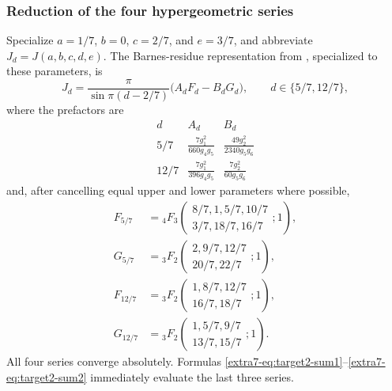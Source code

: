 \documentclass[11pt,a4paper]{article}
\theoremstyle{definition}
\theoremstyle{remark}
\numberwithin{equation}{section}
\begin{document}
\subsubsection{Reduction of the four hypergeometric series}

Specialize $a=1/7$, $b=0$, $c=2/7$, and $e=3/7$, and abbreviate
$J_d=J(a,b,c,d,e)$.  The Barnes-residue representation from
\cite{extra8-zudilin}, specialized to these parameters, is
\begin{equation}\label{extra7-eq:target2-barnes}
 J_d=\frac{\pi}{\sin\pi(d-2/7)}
       \bigl(A_dF_d-B_dG_d\bigr),
 \qquad d\in\{5/7,12/7\},
\end{equation}
where the prefactors are
\[
\begin{array}{c|cc}
 d&A_d&B_d\\ \hline
 5/7&\displaystyle\frac{7g_1^2}{660g_4g_5}
     &\displaystyle\frac{49g_2^2}{2340g_5g_6}\\[2mm]
 12/7&\displaystyle\frac{7g_1^2}{396g_4g_5}
      &\displaystyle\frac{7g_2^2}{60g_5g_6}
\end{array}
\]
and, after cancelling equal upper and lower parameters where possible,
\begin{align*}
 F_{5/7}&={}_4F_3\left(
  \begin{matrix}8/7,1,5/7,10/7\\3/7,18/7,16/7\end{matrix};1\right),\\
 G_{5/7}&={}_3F_2\left(
  \begin{matrix}2,9/7,12/7\\20/7,22/7\end{matrix};1\right),\\
 F_{12/7}&={}_3F_2\left(
  \begin{matrix}1,8/7,12/7\\16/7,18/7\end{matrix};1\right),\\
 G_{12/7}&={}_3F_2\left(
  \begin{matrix}1,5/7,9/7\\13/7,15/7\end{matrix};1\right).
\end{align*}
All four series converge absolutely.  Formulas
\eqref{extra7-eq:target2-sum1}--\eqref{extra7-eq:target2-sum2} immediately evaluate
the last three series.
\end{document}
